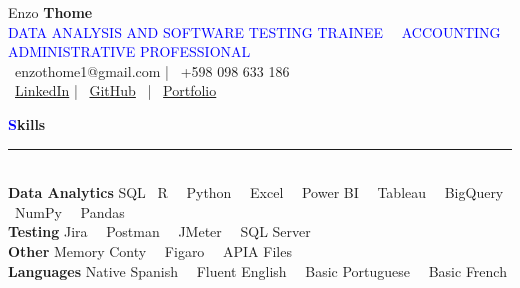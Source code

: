\documentclass[a4paper,10pt]{article}
\begin{document}
\begin{spacing}{1.1}

\begin{center}
\begin{minipage}{0.2\textwidth}
\end{minipage}%
\begin{minipage}{0.78\textwidth}
\begin{center}
{\Huge  Enzo \textbf{Thome}} \\[2pt]
    \textcolor{blue}{DATA ANALYSIS AND SOFTWARE TESTING TRAINEE \, \textbullet \, ACCOUNTING ADMINISTRATIVE PROFESSIONAL} \\[2pt]
    \faEnvelope \, enzothome1@gmail.com | \faPhone \, +598 098 633 186 \\ 
    \faLinkedin \, \href{https://www.linkedin.com/in/enzo-thome-one/}{LinkedIn} | \faGithub \, \href{https://github.com/enzoth7}{GitHub} \, | \faGlobe \, \href{https://sites.google.com/view/enzo-thome}{Portfolio}
    \end{center}
\end{minipage}
\end{center}

\vspace{0.3cm}

\noindent
{\Large\textbf{\textcolor{blue}{S}kills}}
\hspace{0.3em}\rule[0.9ex]{\dimexpr\textwidth-9em}{0.4pt} \\[6pt]
\textbf{Data Analytics} \hfill SQL \textbullet \, R \, \textbullet \, Python \, \textbullet \, Excel \, \textbullet \, Power BI \, \textbullet \, Tableau \, \textbullet \, BigQuery \, \textbullet \, NumPy \, \textbullet \, Pandas \\
\textbf{Testing} \hfill Jira \, \textbullet \, Postman \, \textbullet \, JMeter \, \textbullet \, SQL Server \\ 
\textbf{Other} \hfill Memory Conty \, \textbullet \, Figaro \, \textbullet \, APIA Files \\ 
\textbf{Languages} \hfill Native Spanish \, \textbullet \, Fluent English \, \textbullet \, Basic Portuguese \, \textbullet \, Basic French \\


\end{spacing}
\end{document}
